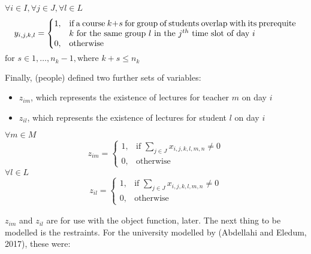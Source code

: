 \documentclass[a4paper, 12pt]{report}
\begin{document}
\begin{math}
	\forall i \in I, \forall j \in J, \forall l \in L
\end{math}
\begin{align*}
	y_{i,j,k,l} = 
	\begin{cases}
		1, & \parbox[t]{9.5cm}{if a course $k + s$ for group of students
		overlap with its prerequite $k$ for the same group $l$ in the $j^{th}$
		time slot of day $i$} \\
		0, & \text{otherwise}
	\end{cases}	
\end{align*}
\begin{math}
	\text{for } s \in 1, \ldots, n_k - 1, \text{where } k + s \leq n_k	
\end{math}

Finally, (people) defined two further sets of variables:
\begin{itemize}
	\item $z_{im}$, which represents the existence of lectures for teacher $m$
	on day $i$
	\item $z_{il}$, which represents the existence of lectures for student $l$
	on day $i$
\end{itemize}

\begin{math}
	\forall m \in M
\end{math}
\begin{align*}
	z_{im} =
	\begin{cases}
		1, & \text{if $\sum_{j \in J} x_{i,j,k,l,m,n} \neq 0$} \\
		0, & \text{otherwise}
	\end{cases}	
\end{align*}
\begin{math}
	\forall l \in L
\end{math}
\begin{align*}
	z_{il} =
	\begin{cases}
		1, & \text{if $\sum_{j \in J} x_{i,j,k,l,m,n} \neq 0$} \\
		0, & \text{otherwise}
	\end{cases}	
\end{align*}

$z_{im}$ and $z_{il}$ are for use with the object function, later. The next
thing to be modelled is the restraints. For the university modelled by
(Abdellahi and Eledum, 2017), these were:
\end{document}
